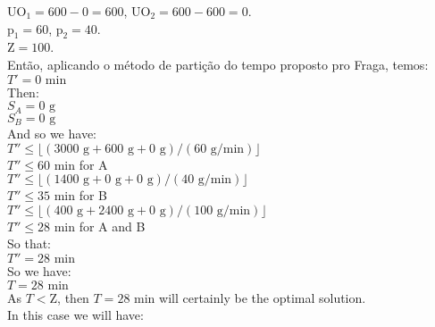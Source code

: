 \documentclass[authoryear,preprint,12pt]{elsarticle}
\begin{document}
$\textrm{UO}_{1} = 600 - 0 = 600$, 
$\textrm{UO}_{2} = 600 - 600 = 0$. \\

$\textrm{p}_{1} = 60$,
$\textrm{p}_{2} = 40$.  \\

$\textrm{Z} = 100$.  \\

Então, aplicando o método de partição do tempo proposto pro Fraga, temos: \\

$T' = 0 \textrm{ min}$ \\

Then:\\

$S_A = 0 \textrm{ g}$ \\

$S_B = 0 \textrm{ g}$ \\

And so we have: \\

$T'' \leq \lfloor{(3000 \textrm{ g} + 600 \textrm{ g} + 0 \textrm{ g}) / (60 \textrm{ g}/\textrm{min})}\rfloor$ \\

$T'' \leq 60 \textrm{ min}$ \quad for A \\

$T'' \leq \lfloor{(1400 \textrm{ g} + 0 \textrm{ g} + 0 \textrm{ g}) / (40 \textrm{ g}/\textrm{min})}\rfloor$ \\

$T'' \leq 35 \textrm{ min}$ \quad for B \\

$T'' \leq \lfloor{(400 \textrm{ g} + 2400 \textrm{ g} + 0 \textrm{ g}) / (100 \textrm{ g}/\textrm{min})}\rfloor$ \\

$T'' \leq 28 \textrm{ min}$ \quad for A and B \\

So that: \\

$T'' = 28 \textrm{ min}$ \\

So we have: \\

$T = 28 \textrm{ min}$ \\

As $T<\textrm{Z}$, then $T = 28 \textrm{ min}$ will certainly be the optimal solution. \\

In this case we will have: \\
\end{document}
